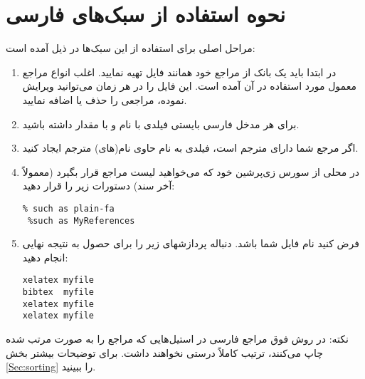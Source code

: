 \documentclass{article}
\theoremstyle{plain}\newtheorem{question}{پرسش}
\begin{document}
\section{ نحوه استفاده از سبک‌های فارسی}
 مراحل اصلی برای استفاده از این سبک‌ها در ذیل آمده است:
\begin{enumerate}
\item در ابتدا باید یک بانک از مراجع خود همانند فایل  تهیه نمایید. اغلب انواع مراجع معمول مورد استفاده در آن آمده است. این فایل را در هر زمان می‌توانید ویرایش نموده، مراجعی را حذف یا اضافه نمایید.
\item برای هر مدخل فارسی بایستی فیلدی با نام  و با مقدار  داشته باشید.
\item اگر مرجع شما دارای مترجم است، فیلدی به نام  حاوی نام(های) مترجم ایجاد کنید.
\item در محلی از سورس زی‌پرشین خود که می‌خواهید لیست مراجع قرار بگیرد (معمولاً آخر سند) دستورات زیر را قرار دهید:
\begin{LTR}
\begin{verbatim}
% such as plain-fa 
 %such as MyReferences
\end{verbatim}
\end{LTR}
\item فرض کنید نام فایل شما   باشد. دنباله پردازشهای زیر را برای حصول به نتیجه نهایی انجام دهید:

\begin{LTR}
\begin{verbatim}
xelatex myfile  
bibtex  myfile  
xelatex myfile  
xelatex myfile  
\end{verbatim}
\end{LTR}
\end{enumerate}
نکته: در روش فوق مراجع فارسی در استیل‌هایی که مراجع را به صورت مرتب شده چاپ می‌کنند، ترتیب کاملاً درستی نخواهند داشت. برای توضیحات بیشتر بخش‌ \ref{Sec:sorting} را ببینید.
\end{document}
